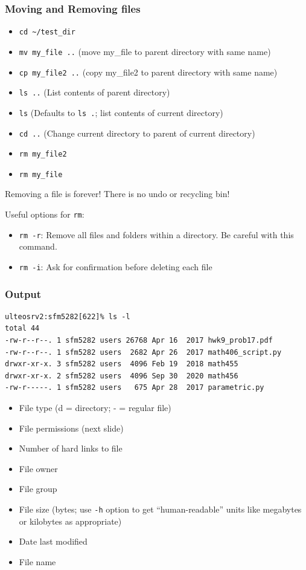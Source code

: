\documentclass[hyperref,pdfa,unicode,utf8,usepdftitle]{beamer}
\begin{document}
\begin{frame}
  \frametitle{Moving and Removing files}
  \begin{itemize}
  \item \lstinline{cd ~/test_dir}
  \item \lstinline{mv my_file ..} (move my\_file to parent directory
    with same name)
  \item \lstinline{cp my_file2 ..} (copy my\_file2 to parent directory
    with same name)
  \item \lstinline{ls ..} (List contents of parent directory)
  \item \lstinline{ls} (Defaults to \lstinline{ls .}; list contents of
    current directory)
  \item \lstinline{cd ..} (Change current directory to parent of current directory)
  \item \lstinline{rm my_file2}
  \item \lstinline{rm my_file}
  \end{itemize}

  \alert{Removing a file is forever! There is no undo or recycling bin!}

  Useful options for \lstinline{rm}:
  \begin{itemize}
  \item \lstinline{rm -r}: Remove all files and folders within a
    directory.  Be careful with this command.
  \item \lstinline{rm -i}: Ask for confirmation before deleting each
    file
  \end{itemize}
\end{frame}

\begin{frame}[fragile]
  \frametitle{ Output}
\begin{lstlisting}
ulteosrv2:sfm5282[622]% ls -l
total 44
-rw-r--r--. 1 sfm5282 users 26768 Apr 16  2017 hwk9_prob17.pdf
-rw-r--r--. 1 sfm5282 users  2682 Apr 26  2017 math406_script.py
drwxr-xr-x. 3 sfm5282 users  4096 Feb 19  2018 math455
drwxr-xr-x. 2 sfm5282 users  4096 Sep 30  2020 math456
-rw-r-----. 1 sfm5282 users   675 Apr 28  2017 parametric.py
\end{lstlisting}
  \begin{itemize}
  \item File type (d = directory; - = regular file)
  \item File permissions (next slide)
  \item Number of hard links to file
  \item File owner
  \item File group
  \item File size (bytes; use \lstinline{-h} option to get
    ``human-readable'' units like megabytes or kilobytes as
    appropriate)
  \item Date last modified
  \item File name
  \end{itemize}

\end{frame}
\end{document}
